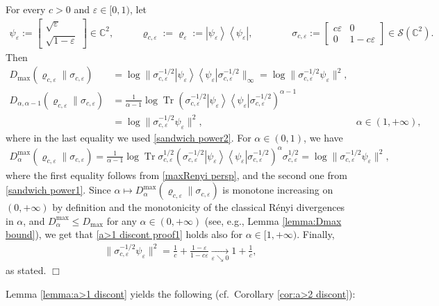 \documentclass[unsortedaddress,superscriptaddress,pra,notitlepage]{revtex4}
\newenvironment{proof}[1][Proof]{\begin{trivlist}
\item[\hskip \labelsep {\bfseries #1}]}{\hfill$\Box$\end{trivlist}}
\def\S{{\mathcal S}}
\def\bC{\mathbb{C}}
\def\ep{\varepsilon}
\def\rho{\varrho}
\def\bz{\left(}
\def\jz{\right)}
\newcommand{\ds}{\mbox{ }\mbox{ }}
\newcommand{\snorm}[1]{\| #1\|}
\newcommand{\diad}[2]{\left|#1\right\rangle\!\left\langle #2\right|}
\newcommand{\pr}[1]{\diad{#1}{#1}}
\DeclareMathOperator{\Tr}{Tr}
\begin{document}
\begin{proof}
For every $c>0$ and $\ep\in[0,1)$, let
\begin{align*}
\psi_{\ep}:=\begin{bmatrix}\sqrt{\ep} \\ \sqrt{1-\ep}\end{bmatrix}\in\bC^2,\ds\ds
\rho_{c,\ep}:=\rho_{\ep}:=\pr{\psi_{\ep}},\ds\ds\ds
\sigma_{c,\ep}:=\begin{bmatrix} c\ep & 0 \\ 0 & 1-c\ep\end{bmatrix}\in\S(\bC^2).
\end{align*}
Then 
\begin{align*}
D_{\max}(\rho_{c,\ep}\|\sigma_{c,\ep})
&=
\log\snorm{\sigma_{c,\ep}^{-1/2}\pr{\psi_{\ep}}\sigma_{c,\ep}^{-1/2}}_{\infty}
=
\log\snorm{\sigma_{c,\ep}^{-1/2}\psi_{\ep}}^2,\\
D_{\alpha,\alpha-1}(\rho_{c,\ep}\|\sigma_{c,\ep})
&=
\frac{1}{\alpha-1}\log\Tr
\bz\sigma_{c,\ep}^{-1/2}\pr{\psi_{\ep}}\sigma_{c,\ep}^{-1/2}\jz^{\alpha-1}\\
&=
\log\snorm{\sigma_{c,\ep}^{-1/2}\psi_{\ep}}^2,
&\alpha\in(1,+\infty),
\end{align*}
where in the last equality we used \eqref{sandwich power2}.
For $\alpha\in(0,1)$, we have
\begin{align}
D_{\alpha}^{\max}(\rho_{c,\ep}\|\sigma_{c,\ep})
=
\frac{1}{\alpha-1}\log\Tr
\sigma_{c,\ep}^{1/2}\bz\sigma_{c,\ep}^{-1/2}\pr{\psi_{\ep}}\sigma_{c,\ep}^{-1/2}\jz^{\alpha}
\sigma_{c,\ep}^{1/2}
=
\log\snorm{\sigma_{c,\ep}^{-1/2}\psi_{\ep}}^2,
\label{a>1 discont proof1}
\end{align}
where the first equality follows from 
\eqref{maxRenyi persp}, and the second one from \eqref{sandwich power1}.
Since $\alpha\mapsto D_{\alpha}^{\max}(\rho_{c,\ep}\|\sigma_{c,\ep})$ is monotone increasing on $(0,+\infty)$ by definition and the monotonicity of the classical R\'enyi 
divergences in $\alpha$, and $D_{\alpha}^{\max}\le D_{\max}$ for any 
$\alpha\in(0,+\infty)$ (see, e.g., Lemma \ref{lemma:Dmax bound}), we get that 
\eqref{a>1 discont proof1} holds also for $\alpha\in[1,+\infty)$. 
Finally, 
\begin{align}
\snorm{\sigma_{c,\ep}^{-1/2}\psi_{\ep}}^2=\frac{1}{c}+\frac{1-\ep}{1-c\ep}
\xrightarrow[\ep\searrow 0]{}1+\frac{1}{c},\label{a>1 discont proof2}
\end{align}
as stated.
\end{proof}

Lemma \ref{lemma:a>1 discont} yields the following 
(cf.~Corollary \ref{cor:a>2 discont}):
\end{document}
